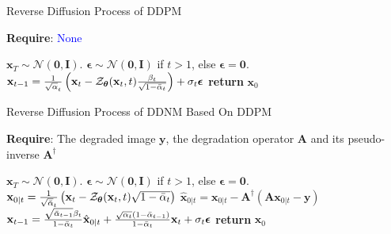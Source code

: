 \documentclass{article} \usepackage{iclr2023_conference,times}
\begin{document}
\begin{algorithm}\caption{Reverse Diffusion Process of DDPM}
\label{alg:ddpm}
\textbf{Require}: \textcolor{blue}{None}
\begin{algorithmic}[1] \State $\mathbf{x}_{T}\sim\mathcal{N}(\mathbf{0},\mathbf{I})$.
\State $\boldsymbol{\epsilon}\sim\mathcal{N}(\mathbf{0},\mathbf{I})$ if $t>1$, else $\boldsymbol{\epsilon}=\mathbf{0}$.
\State $\mathbf{x}_{t-1} = \frac{1}{\sqrt{\alpha}_{t}}	\left( \mathbf{x}_{t} - \mathcal{Z}_{\boldsymbol{\theta}}(\mathbf{x}_{t},t)\frac{\beta_{t}}{\sqrt{1-\Bar{\alpha}_{t}}} \right) +\sigma_{t}\boldsymbol{\epsilon}$
\EndFor
\State \textbf{return} $\mathbf{x}_{0}$
\end{algorithmic}
\end{algorithm}

\begin{algorithm}
\caption{Reverse Diffusion Process of DDNM Based On DDPM}
\label{alg:ddnm appendix version}
\textbf{Require}: The degraded image $\mathbf{y}$, the degradation operator $\mathbf{A}$ and its pseudo-inverse $\mathbf{A}^{\dagger}$
\begin{algorithmic}[1] \State $\mathbf{x}_{T}\sim\mathcal{N}(\mathbf{0},\mathbf{I})$.
\State $\boldsymbol{\epsilon}\sim\mathcal{N}(\mathbf{0},\mathbf{I})$ if $t>1$, else $\boldsymbol{\epsilon}=\mathbf{0}$.
\State $\mathbf{x}_{0|t} = \frac{1}{\sqrt{\bar{\alpha}}_{t}}	\left( \mathbf{x}_{t} - \mathcal{Z}_{\boldsymbol{\theta}}(\mathbf{x}_{t},t)\sqrt{1-\Bar{\alpha}_{t}} \right)$
\State $\mathbf{\hat{x}}_{0|t} =\mathbf{x}_{0|t} -\mathbf{A}^{\dagger}(\mathbf{A}\mathbf{x}_{0|t}-\mathbf{y})$
\State $\mathbf{x}_{t-1} = \frac{\sqrt{\Bar{\alpha}_{t-1}}\beta_{t}}{1-\Bar{\alpha}_{t}}\hat{\mathbf{x}}_{0|t}+ \frac{\sqrt{\alpha_{t}}(1-\Bar{\alpha}_{t-1})}{1-\Bar{\alpha}_{t}}\mathbf{x}_{t} + \sigma_{t}\boldsymbol{\epsilon}$
\EndFor
\State \textbf{return} $\mathbf{x}_{0}$
\end{algorithmic}
\end{algorithm}
\end{document}
